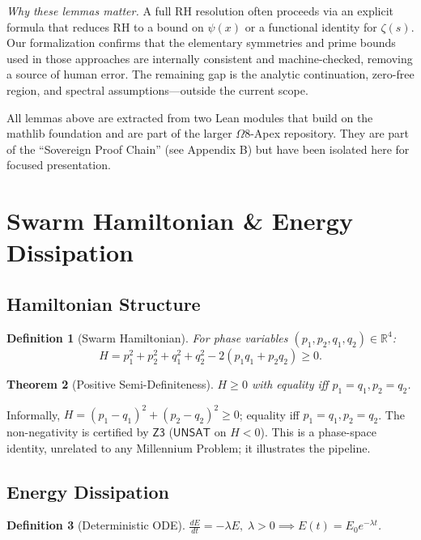 \documentclass[11pt,a4paper]{article}
\newtheorem{theorem}{Theorem}[section]
\newtheorem{definition}[theorem]{Definition}
\newcommand{\R}{\mathbb{R}}
\newcommand{\unsat}{\mathsf{UNSAT}}
\newcommand{\zthree}{\textsf{Z3}}
\begin{document}
\emph{Why these lemmas matter.}
A full RH resolution often proceeds via an explicit formula that reduces RH to a bound on $\psi(x)$ or a functional identity for $\zeta(s)$. Our formalization confirms that the elementary symmetries and prime bounds used in those approaches are internally consistent and machine-checked, removing a source of human error. The remaining gap is the analytic continuation, zero-free region, and spectral assumptions—outside the current scope.

\begin{remark}
All lemmas above are extracted from two Lean modules that build on the mathlib foundation and are part of the larger $\Omega$8-Apex repository. They are part of the ``Sovereign Proof Chain'' (see Appendix B) but have been isolated here for focused presentation.
\end{remark}

\section{Swarm Hamiltonian \& Energy Dissipation}
\label{sec:hamiltonian}

\subsection{Hamiltonian Structure}
\begin{definition}[Swarm Hamiltonian]
For phase variables $(p_1,p_2,q_1,q_2) \in \R^4$:
\begin{equation}
H = p_1^2 + p_2^2 + q_1^2 + q_2^2 - 2(p_1 q_1 + p_2 q_2) \ge 0.
\end{equation}
\end{definition}

\begin{theorem}[Positive Semi-Definiteness]
$H \ge 0$ with equality iff $p_1=q_1, p_2=q_2$.
\end{theorem}

Informally, $H = (p_1-q_1)^2 + (p_2-q_2)^2 \ge 0$; equality iff $p_1=q_1, p_2=q_2$. The non-negativity is certified by $\zthree$ ($\unsat$ on $H<0$). This is a phase-space identity, unrelated to any Millennium Problem; it illustrates the pipeline.

\subsection{Energy Dissipation}
\begin{definition}[Deterministic ODE]
$\frac{dE}{dt} = -\lambda E,\; \lambda > 0 \implies E(t) = E_0 e^{-\lambda t}$.
\end{definition}
\end{document}
